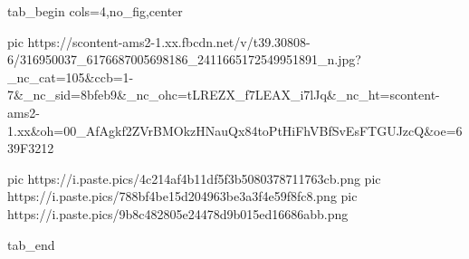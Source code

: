  
 
 
 
 


\ifcmt
  tab_begin cols=4,no_fig,center

     pic https://scontent-ams2-1.xx.fbcdn.net/v/t39.30808-6/316950037_6176687005698186_2411665172549951891_n.jpg?_nc_cat=105&ccb=1-7&_nc_sid=8bfeb9&_nc_ohc=tLREZX_f7LEAX_i7lJq&_nc_ht=scontent-ams2-1.xx&oh=00_AfAgkf2ZVrBMOkzHNauQx84toPtHiFhVBfSvEsFTGUJzcQ&oe=639F3212

		 pic https://i.paste.pics/4c214af4b11df5f3b5080378711763cb.png
		 pic https://i.paste.pics/788bf4be15d204963be3a3f4e59f8fc8.png
		 pic https://i.paste.pics/9b8c482805e24478d9b015ed16686abb.png

  tab_end
\fi
